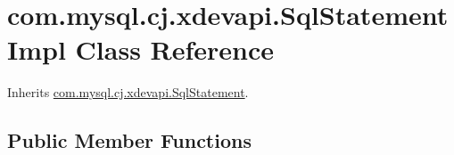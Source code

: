 \hypertarget{classcom_1_1mysql_1_1cj_1_1xdevapi_1_1_sql_statement_impl}{}\section{com.\+mysql.\+cj.\+xdevapi.\+Sql\+Statement\+Impl Class Reference}
\label{classcom_1_1mysql_1_1cj_1_1xdevapi_1_1_sql_statement_impl}


Inherits \mbox{\hyperlink{interfacecom_1_1mysql_1_1cj_1_1xdevapi_1_1_sql_statement}{com.\+mysql.\+cj.\+xdevapi.\+Sql\+Statement}}.

\subsection*{Public Member Functions}
